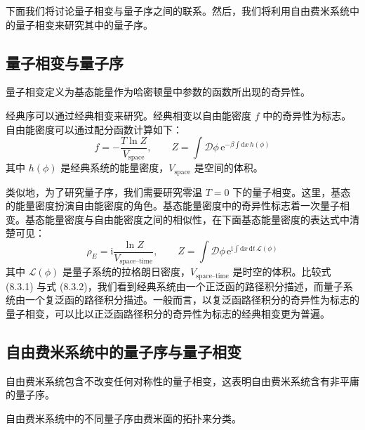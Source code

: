 下面我们将讨论量子相变与量子序之间的联系。然后，我们将利用自由费米系统中的量子相变来研究其中的量子序。

\subsection{量子相变与量子序}

\begin{keypoints}
\item 量子相变定义为基态能量作为哈密顿量中参数的函数所出现的奇异性。
\end{keypoints}

经典序可以通过经典相变来研究。经典相变以自由能密度 $f$ 中的奇异性为标志。自由能密度可以通过配分函数计算如下：
\begin{equation*}
f=-\frac{T\ln Z}{V_{\text{space}}},\qquad Z=\int\mathcal{D}\phi\,\mathrm{e}^{-\beta\int\mathrm{d}x\,h(\phi)}\tag{8.3.1}
\end{equation*}
其中 $h(\phi)$ 是经典系统的能量密度，$V_{\text{space}}$ 是空间的体积。

类似地，为了研究量子序，我们需要研究零温 $T=0$ 下的量子相变。这里，基态的能量密度扮演自由能密度的角色。基态能量密度中的奇异性标志着一次量子相变。基态能量密度与自由能密度之间的相似性，在下面基态能量密度的表达式中清楚可见：
\begin{equation*}
\rho_{E}=\mathrm{i}\frac{\ln Z}{V_{\text{space--time}}},\qquad Z=\int\mathcal{D}\phi\,\mathrm{e}^{\mathrm{i}\int\mathrm{d}x\,\mathrm{d}t\,\mathcal{L}(\phi)}\tag{8.3.2}
\end{equation*}
其中 $\mathcal{L}(\phi)$ 是量子系统的拉格朗日密度，$V_{\text{space--time}}$ 是时空的体积。比较式 (8.3.1) 与式 (8.3.2)，我们看到经典系统由一个正泛函的路径积分描述，而量子系统由一个复泛函的路径积分描述。一般而言，以复泛函路径积分的奇异性为标志的量子相变，可以比以正泛函路径积分的奇异性为标志的经典相变更为普遍。


\subsection{自由费米系统中的量子序与量子相变}

\begin{keypoints}
\item 自由费米系统包含不改变任何对称性的量子相变，这表明自由费米系统含有非平庸的量子序。
\item 自由费米系统中的不同量子序由费米面的拓扑来分类。
\end{keypoints}

